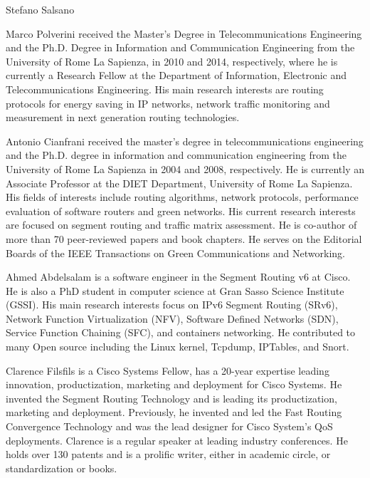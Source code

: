 \documentclass[10pt,journal,twocolumn]{IEEEtran}
\begin{document}
{\begin{IEEEbiography}{Stefano Salsano}
\end{IEEEbiography}
\begin{IEEEbiography}{Marco Polverini} received the Master's Degree in Telecommunications Engineering and the Ph.D. Degree in Information and Communication Engineering from the University of Rome La Sapienza, in 2010 and 2014, respectively, where he is currently a Research Fellow at the Department of Information, Electronic and Telecommunications Engineering. His main research interests are routing protocols for energy saving in IP networks, network traffic monitoring and measurement in next generation routing technologies.
\end{IEEEbiography}
\begin{IEEEbiography}{Antonio Cianfrani} received the master's degree in telecommunications engineering and the Ph.D. degree in information and communication engineering from the University of Rome La Sapienza in 2004 and 2008, respectively. He is currently an Associate Professor at the DIET Department, University of Rome La Sapienza. His fields of interests include routing algorithms, network protocols, performance evaluation of software routers and green networks. His current research interests are focused on segment routing and traffic matrix assessment. He is co-author of more than 70 peer-reviewed papers and book chapters. He serves on the Editorial Boards of the IEEE Transactions on Green Communications and Networking.
\end{IEEEbiography}
\begin{IEEEbiography}{Ahmed Abdelsalam} is a software engineer in the Segment Routing v6 at Cisco. He is also a PhD student in computer science at Gran Sasso Science Institute (GSSI). His main research interests focus on IPv6 Segment Routing (SRv6), Network Function Virtualization (NFV), Software Defined Networks (SDN), Service Function Chaining (SFC), and containers networking. He contributed to many Open source including the Linux kernel, Tcpdump, IPTables, and Snort.
\end{IEEEbiography}
\begin{IEEEbiography}{Clarence Filsfils}
is a Cisco Systems Fellow, has a 20-year expertise leading innovation, productization, marketing and deployment for Cisco Systems. He invented the Segment Routing Technology and is leading its productization, marketing and deployment. Previously, he invented and led the Fast Routing Convergence Technology and was the lead designer for Cisco System's QoS deployments. Clarence is a regular speaker at leading industry conferences. He holds over 130 patents and is a prolific writer, either in academic circle, or standardization or books.

\end{IEEEbiography}}
\end{document}
